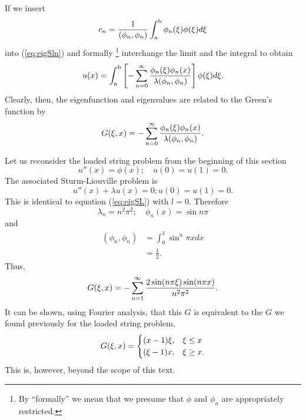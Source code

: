 If we insert 
\begin{equation*}
    c_n = \frac{1}{(\phi_n,\phi_n)}\int_{\mathrm{a}}^{\mathrm{b}} \phi_n(\xi) \phi(\xi) d\xi
\end{equation*}
into (\ref{eq:eigSln}) and formally \footnote{By ``formally'' we mean that we presume that \(\phi\) and \(\phi_n\) are appropriately restricted. } interchange the limit and the integral to obtain
\begin{equation*}
    u(x) = \int_{\mathrm{a}}^{\mathrm{b}} \left[-\sum_{n=0}^{\infty} \frac{\phi_n(\xi) \phi_n(x)}{\lambda (\phi_n,\phi_n)}\right] \phi(\xi)d\xi.
\end{equation*}
Clearly, then, the eigenfunction and eigenvalues are related to the Green's function by 
\begin{equation*}
    G(\xi,x) = -\sum_{n=0}^{\infty} \frac{\phi_n(\xi) \phi_n(x)}{\lambda (\phi_n,\phi_n)}.
\end{equation*}

Let us reconsider the loaded string problem from the beginning of this section
\begin{equation*}
    u''(x)=\phi(x);\quad u(0)=u(1)=0.
\end{equation*}
The associated Sturm-Liouville problem is 
\begin{equation*}
    u''(x)+\lambda u(x)=0; u(0)=u(1)=0.
\end{equation*}
This is identical to equation (\ref{eq:eigSL}) with \(l=0\). Therefore
\begin{equation*}
    \lambda_n = n^2\pi^2; \quad \phi_n(x) = \sin n\pi
\end{equation*}
and
\begin{equation*}
    \begin{split}
        (\phi_n, \phi_n) &= \int_{0}^{1} \sin^ n\pi x dx\\
        &=\frac12.
    \end{split}
\end{equation*}
Thus,
\begin{equation*}
    G(\xi,x) = -\sum_{n=1}^{\infty} \frac{2\sin (n\pi \xi)\sin (n\pi x)}{n^2\pi^2}.
\end{equation*}
It can be shown, using Fourier analysis, that this \(G\) is equivalent to the \(G\) we found previously for the loaded string problem,
\begin{equation*}
    G(\xi,x) = \begin{cases}
        (x-1)\xi, & \xi\leq x\\
        (\xi-1)x, & \xi \geq x.
    \end{cases}
\end{equation*}
This is, however, beyond the scope of this text.